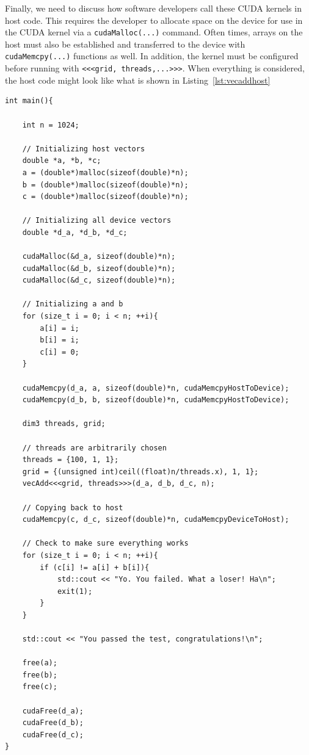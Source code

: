 Finally, we need to discuss how software developers call these CUDA kernels in host code.
This requires the developer to allocate space on the device for use in the CUDA kernel via a \texttt{cudaMalloc(...)} command.
Often times, arrays on the host must also be established and transferred to the device with \texttt{cudaMemcpy(...)} functions as well.
In addition, the kernel must be configured before running with \lstinline{<<<grid, threads,...>>>}.
When everything is considered, the host code might look like what is shown in Listing~\ref{lst:vecaddhost}

\begin{lstlisting}[float,label=lst:vecaddhost, style=c++,caption={An example of host code to run Listing~\ref{lst:vecaddCUDA2}.}]
int main(){

    int n = 1024;

    // Initializing host vectors
    double *a, *b, *c;
    a = (double*)malloc(sizeof(double)*n);
    b = (double*)malloc(sizeof(double)*n);
    c = (double*)malloc(sizeof(double)*n);

    // Initializing all device vectors
    double *d_a, *d_b, *d_c;

    cudaMalloc(&d_a, sizeof(double)*n);
    cudaMalloc(&d_b, sizeof(double)*n);
    cudaMalloc(&d_c, sizeof(double)*n);

    // Initializing a and b
    for (size_t i = 0; i < n; ++i){
        a[i] = i;
        b[i] = i;
        c[i] = 0;
    }

    cudaMemcpy(d_a, a, sizeof(double)*n, cudaMemcpyHostToDevice);
    cudaMemcpy(d_b, b, sizeof(double)*n, cudaMemcpyHostToDevice);

    dim3 threads, grid;

    // threads are arbitrarily chosen
    threads = {100, 1, 1};
    grid = {(unsigned int)ceil((float)n/threads.x), 1, 1};
    vecAdd<<<grid, threads>>>(d_a, d_b, d_c, n);

    // Copying back to host
    cudaMemcpy(c, d_c, sizeof(double)*n, cudaMemcpyDeviceToHost);

    // Check to make sure everything works
    for (size_t i = 0; i < n; ++i){
        if (c[i] != a[i] + b[i]){
            std::cout << "Yo. You failed. What a loser! Ha\n";
            exit(1);
        }
    }

    std::cout << "You passed the test, congratulations!\n";

    free(a);
    free(b);
    free(c);

    cudaFree(d_a);
    cudaFree(d_b);
    cudaFree(d_c);
}
\end{lstlisting}

